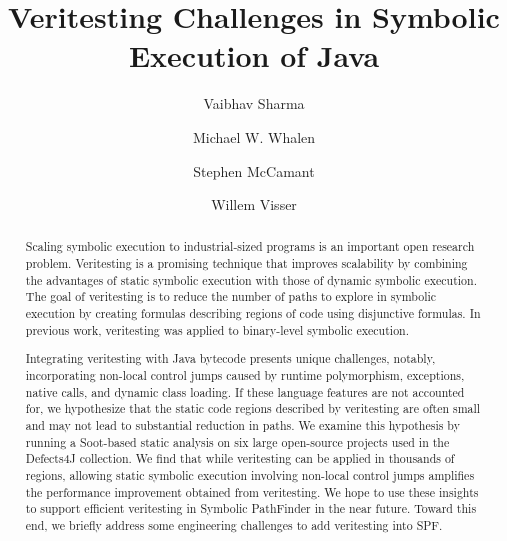\documentclass{acm_sen_article}
\begin{document}
\title{Veritesting Challenges in Symbolic Execution of Java}
\author[1]{Vaibhav Sharma}
\author[1]{Michael W. Whalen}
\author[1]{Stephen McCamant}
\author[2]{Willem Visser}
% 
% 
% 


\maketitle
\begin{abstract}
Scaling symbolic execution to industrial-sized programs is an important open research problem.
%
Veritesting is a promising technique that improves scalability by combining the advantages of static symbolic execution with those of dynamic symbolic execution.  The goal of veritesting is to reduce the number of paths to explore in symbolic execution by creating formulas describing regions of code using disjunctive formulas.
%
In previous work, veritesting was applied to binary-level symbolic execution.

Integrating veritesting with Java bytecode presents unique challenges,
notably, incorporating non-local control jumps caused by runtime polymorphism, exceptions, native calls, and dynamic class loading.
%
If these language features are not accounted for, we hypothesize that the static code regions described by veritesting are often small and may not lead to substantial reduction in paths.  We examine this hypothesis by running a Soot-based static analysis on six large open-source projects used in the Defects4J collection.
%
We find that while veritesting can be applied in thousands of regions, allowing static symbolic execution involving non-local control jumps amplifies the performance improvement obtained from veritesting.
%
We hope to use these insights to support efficient veritesting in Symbolic PathFinder in the near future.  Toward this end, we briefly address some engineering challenges to add veritesting into SPF.
\end{abstract}
\end{document}
